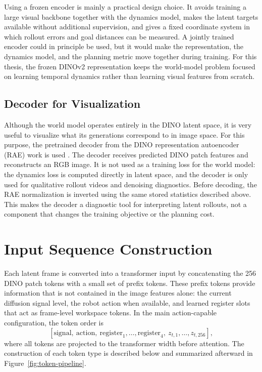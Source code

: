 \documentclass[12pt]{report}
\begin{document}
Using a frozen encoder is mainly a practical design choice. It avoids training a large visual backbone together with the dynamics model, makes the latent targets available without additional supervision, and gives a fixed coordinate system in which rollout errors and goal distances can be measured. A jointly trained encoder could in principle be used, but it would make the representation, the dynamics model, and the planning metric move together during training. For this thesis, the frozen DINOv2 representation keeps the world-model problem focused on learning temporal dynamics rather than learning visual features from scratch.

\subsection{Decoder for Visualization}
Although the world model operates entirely in the DINO latent space, it is very useful to visualize what its generations correspond to in image space. For this purpose, the pretrained decoder from the DINO representation autoencoder (RAE) work is used \cite{dt_rae2025}. The decoder receives predicted DINO patch features and reconstructs an RGB image. It is not used as a training loss for the world model: the dynamics loss is computed directly in latent space, and the decoder is only used for qualitative rollout videos and denoising diagnostics.
Before decoding, the RAE normalization is inverted using the same stored statistics described above. This makes the decoder a diagnostic tool for interpreting latent rollouts, not a component that changes the training objective or the planning cost.

\section{Input Sequence Construction}
Each latent frame is converted into a transformer input by concatenating the 256 DINO patch tokens with a small set of prefix tokens. These prefix tokens provide information that is not contained in the image features alone: the current diffusion signal level, the robot action when available, and learned register slots that act as frame-level workspace tokens. In the main action-capable configuration, the token order is
\begin{equation}
\label{eq:token-layout}
[\mathrm{signal},\ \mathrm{action},\ \mathrm{register}_1,\ldots,\mathrm{register}_4,\ z_{t,1},\ldots,z_{t,256}],
\end{equation}
where all tokens are projected to the transformer width before attention. The construction of each token type is described below and summarized afterward in Figure~\ref{fig:token-pipeline}.
\end{document}
